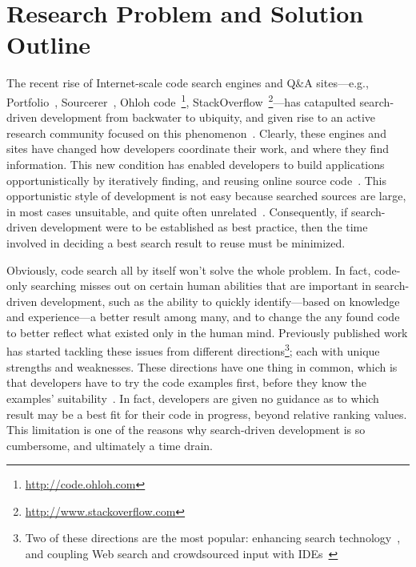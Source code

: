 \documentclass[conference]{IEEEtran}
\begin{document}
\section{Research Problem and Solution Outline}
\label{sec:intro}

The recent rise of Internet-scale code search engines and Q\&A sites---e.g., Portfolio~\cite{McMillan:2011wq}, Sourcerer~\cite{Bajracharya:2006vn}, Ohloh code~\footnote{\url{http://code.ohloh.com}}, StackOverflow~\footnote{\url{http://www.stackoverflow.com}}---has catapulted search-driven development from backwater to ubiquity, and given rise to an active research community focused on this phenomenon~\cite{Bajracharya:2009fj, Bajracharya:2010iy, Bajracharya:2011kw}. Clearly, these engines and sites have changed how developers coordinate their work, and where they find information. This new condition has enabled developers to build applications opportunistically by iteratively finding, and reusing online source code~\cite{Brandt:2008wi, Ncube:2008fm, Brandt:2009jb, McMillan:2012dj}. This opportunistic style of development is not easy because searched sources are large, in most cases unsuitable, and quite often unrelated~\cite{GallardoValencia:2009gr}. Consequently, if search-driven development were to be established as best practice, then the time involved in deciding a best search result to reuse must be minimized.

Obviously, code search all by itself won't solve the whole problem. In fact, code-only searching misses out on certain human abilities that are important in search-driven development, such as the ability to quickly identify---based on knowledge and experience---a better result among many, and to change the any found code to better reflect what existed only in the human mind. Previously published work has started tackling these issues from different directions\footnote{Two of these directions are the most popular: enhancing search technology~\cite{Bajracharya:2010um, Gysin:2010kt, McMillan:2011cm, McMillan:2012dj, Ying:2012tr}, and coupling Web search and crowdsourced input with IDEs~\cite{Bacchelli:2012dl, Brandt:2010tp, Hartmann:2010hx, Hoffmann:2007wo, Oney:2012ge, Wightman:2012gc}}; each with unique strengths and weaknesses. These directions have one thing in common, which is that developers have to try the code examples first, before they know the examples' suitability~\cite{Sim:2011:WSE:2063239.2063243}. In fact, developers are given no guidance as to which result may be a best fit for their code in progress, beyond relative ranking values. This limitation is one of the reasons why search-driven development is so cumbersome, and ultimately a time drain.
\end{document}
